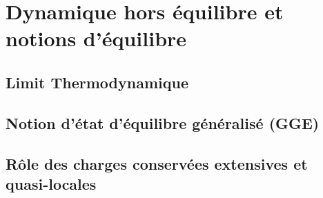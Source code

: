 \section{Dynamique hors équilibre et notions d’équilibre}
\subsection{Limit Thermodynamique}

\subsection{Notion d’état d’équilibre généralisé (GGE)}

\subsection{Rôle des charges conservées extensives et quasi-locales}

